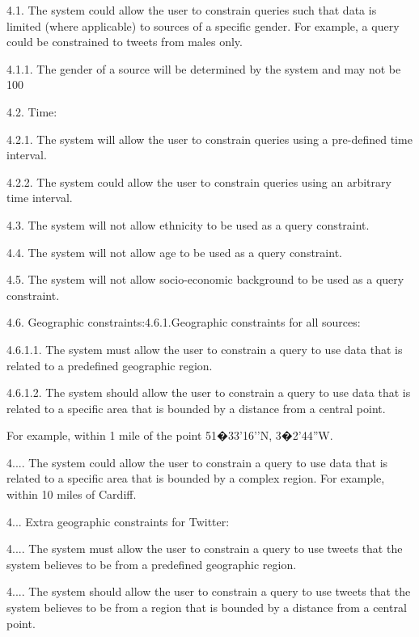 \begin{DoxyVerb}
    4.1. The system could allow the user to constrain queries such that data is limited (where applicable) to sources of a specific gender. For example, a query could be constrained to tweets from males only.    

        4.1.1. The gender of a source will be determined by the system and may not be 100%

    4.2. Time:    

        4.2.1. The system will allow the user to constrain queries using a pre-defined time interval.    

        4.2.2. The system could allow the user to constrain queries using an arbitrary time interval.    

    4.3. The system will not allow ethnicity to be used as a query constraint.    

    4.4. The system will not allow age to be used as a query constraint.    

    4.5. The system will not allow socio-economic background to be used as a query constraint.    

    4.6. Geographic constraints:4.6.1.Geographic constraints for all sources:    

        4.6.1.1. The system must allow the user to constrain a query to use data that is related to a predefined geographic region.    

        4.6.1.2. The system should allow the user to constrain a query to use data that is related to a specific area that is bounded by a distance from a central point. 
\end{DoxyVerb}
 
\begin{DoxyCode}
For example, within 1 mile of the point 51�33\textcolor{stringliteral}{'16'}\textcolor{stringliteral}{'N, 3�2'}44\textcolor{stringliteral}{''}W.
\end{DoxyCode}


4.... The system could allow the user to constrain a query to use data that is related to a specific area that is bounded by a complex region. For example, within 10 miles of Cardiff.

4... Extra geographic constraints for Twitter\+:

4.... The system must allow the user to constrain a query to use tweets that the system believes to be from a predefined geographic region.

4.... The system should allow the user to constrain a query to use tweets that the system believes to be from a region that is bounded by a distance from a central point.

